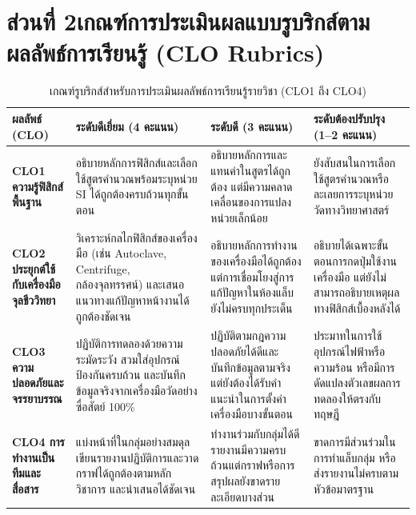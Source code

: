 \section*{ส่วนที่ 2\quad เกณฑ์การประเมินผลแบบรูบริกส์ตามผลลัพธ์การเรียนรู้ (CLO Rubrics)}

\begin{table}[H]
\centering
\caption{เกณฑ์รูบริกส์สำหรับการประเมินผลลัพธ์การเรียนรู้รายวิชา (CLO1 ถึง CLO4)}
\footnotesize
\begin{tabularx}{\textwidth}{>{\raggedright\arraybackslash\bfseries}p{2.2cm} >{\raggedright\arraybackslash}X >{\raggedright\arraybackslash}X >{\raggedright\arraybackslash}X}
\toprule
ผลลัพธ์ (CLO) & ระดับดีเยี่ยม (4 คะแนน) & ระดับดี (3 คะแนน) & ระดับต้องปรับปรุง (1--2 คะแนน) \\
\midrule
CLO1 ความรู้ฟิสิกส์พื้นฐาน & อธิบายหลักการฟิสิกส์และเลือกใช้สูตรคำนวณพร้อมระบุหน่วย SI ได้ถูกต้องครบถ้วนทุกขั้นตอน & อธิบายหลักการและแทนค่าในสูตรได้ถูกต้อง แต่มีความคลาดเคลื่อนของการแปลงหน่วยเล็กน้อย & ยังสับสนในการเลือกใช้สูตรคำนวณหรือละเลยการระบุหน่วยวัดทางวิทยาศาสตร์ \\
\addlinespace[4pt]
CLO2 ประยุกต์ใช้กับเครื่องมือจุลชีววิทยา & วิเคราะห์กลไกฟิสิกส์ของเครื่องมือ (เช่น Autoclave, Centrifuge, กล้องจุลทรรศน์) และเสนอแนวทางแก้ปัญหาหน้างานได้ถูกต้องชัดเจน & อธิบายหลักการทำงานของเครื่องมือได้ถูกต้อง แต่การเชื่อมโยงสู่การแก้ปัญหาในห้องแล็บยังไม่ครบทุกประเด็น & อธิบายได้เฉพาะขั้นตอนการกดปุ่มใช้งานเครื่องมือ แต่ยังไม่สามารถอธิบายเหตุผลทางฟิสิกส์เบื้องหลังได้ \\
\addlinespace[4pt]
CLO3 ความปลอดภัยและจรรยาบรรณ & ปฏิบัติการทดลองด้วยความระมัดระวัง สวมใส่อุปกรณ์ป้องกันครบถ้วน และบันทึกข้อมูลจริงจากเครื่องมือวัดอย่างซื่อสัตย์ 100\% & ปฏิบัติตามกฎความปลอดภัยได้ดีและบันทึกข้อมูลตามจริง แต่ยังต้องได้รับคำแนะนำในการตั้งค่าเครื่องมือบางขั้นตอน & ประมาทในการใช้อุปกรณ์ไฟฟ้าหรือความร้อน หรือมีการดัดแปลงตัวเลขผลการทดลองให้ตรงกับทฤษฎี \\
\addlinespace[4pt]
CLO4 การทำงานเป็นทีมและสื่อสาร & แบ่งหน้าที่ในกลุ่มอย่างสมดุล เขียนรายงานปฏิบัติการและวาดกราฟได้ถูกต้องตามหลักวิชาการ และนำเสนอได้ชัดเจน & ทำงานร่วมกับกลุ่มได้ดี รายงานมีความครบถ้วนแต่กราฟหรือการสรุปผลยังขาดรายละเอียดบางส่วน & ขาดการมีส่วนร่วมในการทำแล็บกลุ่ม หรือส่งรายงานไม่ครบตามหัวข้อมาตรฐาน \\
\bottomrule
\end{tabularx}
\end{table}
